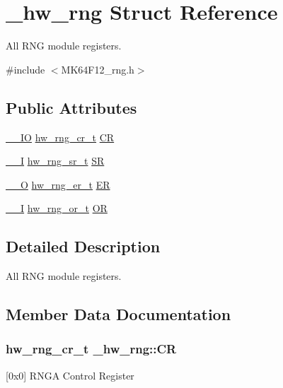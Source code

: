 \hypertarget{struct__hw__rng}{}\section{\+\_\+hw\+\_\+rng Struct Reference}
\label{struct__hw__rng}


All R\+NG module registers.  




{\ttfamily \#include $<$M\+K64\+F12\+\_\+rng.\+h$>$}

\subsection*{Public Attributes}
\begin{DoxyCompactItemize}
\item 
\hyperlink{core__sc300_8h_aec43007d9998a0a0e01faede4133d6be}{\+\_\+\+\_\+\+IO} \hyperlink{union__hw__rng__cr}{hw\+\_\+rng\+\_\+cr\+\_\+t} \hyperlink{struct__hw__rng_a726f95acf2b907800aa3d8951527d51d}{CR}
\item 
\hyperlink{core__sc300_8h_af63697ed9952cc71e1225efe205f6cd3}{\+\_\+\+\_\+I} \hyperlink{union__hw__rng__sr}{hw\+\_\+rng\+\_\+sr\+\_\+t} \hyperlink{struct__hw__rng_a5c6bd10c3da46c2f4fd216c77181b091}{SR}
\item 
\hyperlink{core__sc300_8h_a7e25d9380f9ef903923964322e71f2f6}{\+\_\+\+\_\+O} \hyperlink{union__hw__rng__er}{hw\+\_\+rng\+\_\+er\+\_\+t} \hyperlink{struct__hw__rng_af101b103abe0f380514b23002f5e24ff}{ER}
\item 
\hyperlink{core__sc300_8h_af63697ed9952cc71e1225efe205f6cd3}{\+\_\+\+\_\+I} \hyperlink{union__hw__rng__or}{hw\+\_\+rng\+\_\+or\+\_\+t} \hyperlink{struct__hw__rng_a342ac91df2f30679bd1bf3daaaf3d495}{OR}
\end{DoxyCompactItemize}


\subsection{Detailed Description}
All R\+NG module registers. 

\subsection{Member Data Documentation}
\subsubsection[{\texorpdfstring{CR}{CR}}]{ {\bf hw\+\_\+rng\+\_\+cr\+\_\+t} \+\_\+hw\+\_\+rng\+::\+CR}\hypertarget{struct__hw__rng_a726f95acf2b907800aa3d8951527d51d}{}\label{struct__hw__rng_a726f95acf2b907800aa3d8951527d51d}
\mbox{[}0x0\mbox{]} R\+N\+GA Control Register 
